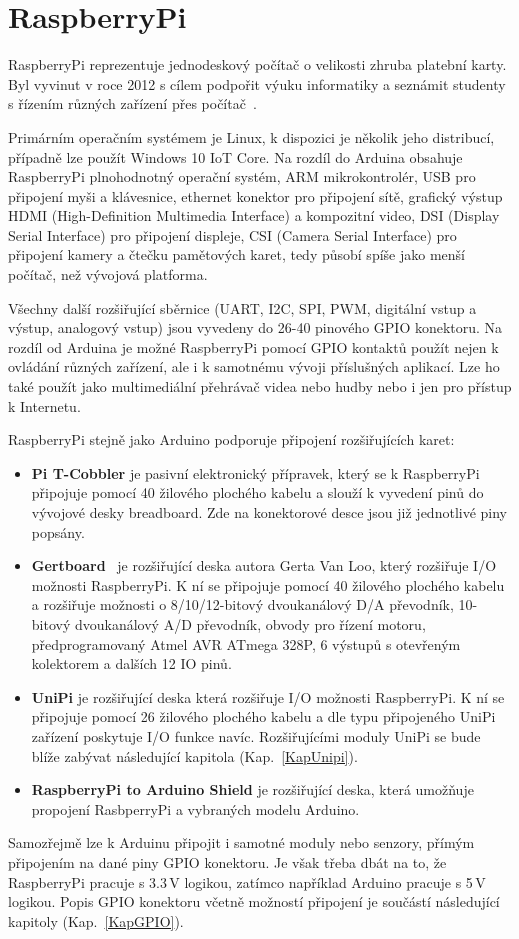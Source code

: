 \section{RaspberryPi}
\label{KapRaspi}

RaspberryPi reprezentuje jednodeskový počítač o velikosti zhruba platební karty. Byl vyvinut v roce 2012 s cílem podpořit výuku informatiky a seznámit studenty s řízením různých zařízení přes počítač~\cite{Raspi}. 

Primárním operačním systémem je Linux, k dispozici je několik jeho distribucí, případně lze použít Windows 10 IoT Core. Na rozdíl do Arduina obsahuje RaspberryPi plnohodnotný operační systém, ARM mikrokontrolér, USB pro připojení myši a klávesnice, ethernet konektor pro připojení sítě, grafický výstup HDMI (High-Definition Multimedia Interface) a kompozitní video, DSI (Display Serial Interface) pro připojení displeje, CSI (Camera Serial Interface) pro připojení kamery a čtečku pamětových karet, tedy působí spíše jako menší počítač, než vývojová platforma. 

Všechny další rozšiřující sběrnice (UART, I2C, SPI, PWM, digitální vstup a výstup, analogový vstup) jsou vyvedeny do 26-40 pinového GPIO konektoru. Na rozdíl od Arduina je možné RaspberryPi pomocí GPIO kontaktů použít nejen k ovládání různých zařízení, ale i k samotnému vývoji příslušných aplikací. Lze ho také použít jako multimediální přehrávač videa nebo hudby nebo i jen pro přístup k Internetu.

RaspberryPi stejně jako Arduino podporuje připojení rozšiřujících karet:

\begin{itemize}
	\item \textbf{Pi T-Cobbler} je pasivní elektronický přípravek, který se k RaspberryPi připojuje pomocí 40 žilového plochého kabelu a slouží k vyvedení pinů do vývojové desky breadboard. Zde na konektorové desce jsou již jednotlivé piny popsány.
\item \textbf{Gertboard}~\cite{GertBoard} je rozšiřující deska autora Gerta Van Loo, který rozšiřuje I/O možnosti RaspberryPi. K ní se připojuje pomocí 40 žilového plochého kabelu a rozšiřuje možnosti o 8/10/12-bitový dvoukanálový D/A převodník, 10-bitový dvoukanálový A/D převodník, obvody pro řízení motoru, předprogramovaný Atmel AVR ATmega 328P, 6 výstupů s otevřeným kolektorem a dalších 12 IO pinů. 
\item \textbf{UniPi} je rozšiřující deska která rozšiřuje I/O možnosti RaspberryPi. K ní se připojuje pomocí 26 žilového plochého kabelu a dle typu připojeného UniPi zařízení poskytuje I/O funkce navíc. Rozšiřujícími moduly UniPi se bude blíže zabývat následující kapitola (Kap.~\ref{KapUnipi}).
\item \textbf{RaspberryPi to Arduino Shield} je rozšiřující deska, která umožňuje propojení RasbperryPi a vybraných modelu Arduino.
\end{itemize}
Samozřejmě lze k Arduinu připojit i samotné moduly nebo senzory, přímým připojením na dané piny GPIO konektoru. Je však třeba dbát na to, že RaspberryPi pracuje s 3.3\,V logikou, zatímco například Arduino pracuje s 5\,V logikou. Popis GPIO konektoru včetně možností připojení je součástí následující kapitoly (Kap.~\ref{KapGPIO}).

